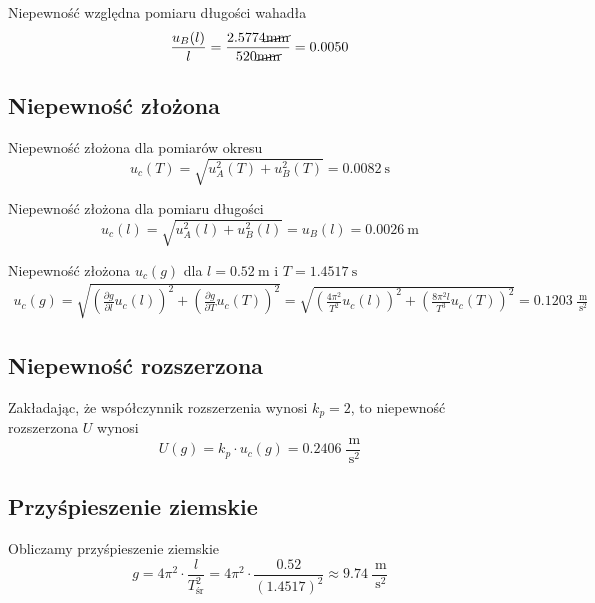 \documentclass{fizykalab}
\begin{document}
{  \par
  Niepewność względna pomiaru długości wahadła
  \[ \frac{u_B(l)}{l} = \frac{ 2.5774\cancel{ \SI{}{\milli\meter}} }{ 520\cancel{ \SI{}{\milli\meter}} } = 0.0050\]

  \subsection*{Niepewność złożona}
  \par
  Niepewność złożona dla pomiarów okresu
  \[ u_c(T) = \sqrt{u_A^2(T) + u_B^2(T)} = \SI{0.0082}{\second}\]

  \par
  Niepewność złożona dla pomiaru długości
  \[ u_c(l) = \sqrt{u_A^2(l) + u_B^2(l)} = u_B(l) = \SI{0.0026}{\meter}\]

  \par
  Niepewność złożona $u_c(g)$ dla $l = \SI{0.52}{\meter}$ i $T = \SI{1.4517}{\second}$
  \begin{gather*}
	  u_c(g) = \sqrt{ \left( \frac{\partial g}{\partial l} u_c(l) \right)^2 + \left( \frac{\partial g}{\partial T} u_c(T) \right)^2 } = \sqrt{ \left( \frac{4\pi^2}{T^2} u_c(l) \right)^2 + \left( \frac{8\pi^2l}{T^3} u_c(T) \right)^2 } = 0.1203 \ \frac{\SI{}{\meter}}{\SI{}{\second}^2}
  \end{gather*}

 }

\subsection*{Niepewność rozszerzona}
\par
Zakładając, że współczynnik rozszerzenia wynosi $k_p = 2$, to niepewność rozszerzona $U$ wynosi
\[ U(g) = k_p \cdot u_c(g) = 0.2406 \ \frac{\SI{}{\meter}}{\SI{}{\second}^2} \]

\subsection*{Przyśpieszenie ziemskie}
\par
Obliczamy przyśpieszenie ziemskie
\[ g = 4\pi^2\cdot\frac{l}{T_\text{śr}^2} =  4\pi^2\cdot\frac{0.52}{(1.4517)^2} \approx 9.74 \ \frac{\SI{}{\meter}}{\SI{}{\second}^2} \]


\newpage
\end{document}
